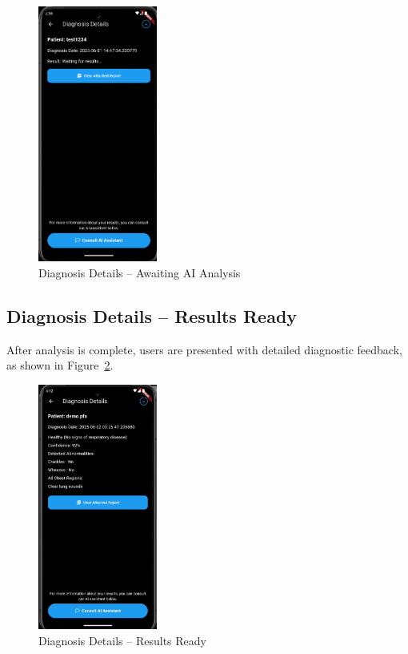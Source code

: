 \begin{figure}[H]
    \centering
    \includegraphics[width=0.35\textwidth]{images/UI_Screenshots/diagnosis_details_screen_waiting_for_results.png}
    \caption{Diagnosis Details – Awaiting AI Analysis}
    \label{fig:diagnosis_waiting}
\end{figure}

\subsection{Diagnosis Details – Results Ready}

After analysis is complete, users are presented with detailed diagnostic feedback, as shown in Figure~\ref{fig:diagnosis_results}.

\begin{figure}[H]
    \centering
    \includegraphics[width=0.35\textwidth]{images/UI_Screenshots/diagnosis_details_screen_results_ready.png}
    \caption{Diagnosis Details – Results Ready}
    \label{fig:diagnosis_results}
\end{figure}


